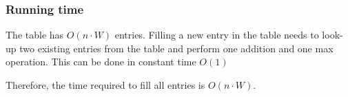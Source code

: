 \documentclass{article}
\begin{document}
\subsubsection{Running time}

The table has $O(n\cdot W)$ entries. Filling a new entry in the table needs to look-up two existing entries from the table and perform one addition and one max operation. This can be done in constant time $O(1)$

Therefore, the time required to fill all entries is $O(n\cdot W)$.
\end{document}

